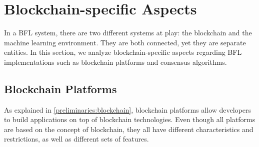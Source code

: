 

% 







\section{Blockchain-specific Aspects}

In a BFL system, there are two different systems at play: the blockchain and the machine learning environment. They are both connected, yet they are separate entities. In this section, we analyze blockchain-specific aspects regarding BFL implementations such as blockchain platforms and consensus algorithms.

\subsection{Blockchain Platforms}

As explained in \autoref{preliminaries:blockchain}, blockchain platforms allow developers to build applications on top of blockchain technologies. Even though all platforms are based on the concept of blockchain, they all have different characteristics and restrictions, as well as different sets of features.


